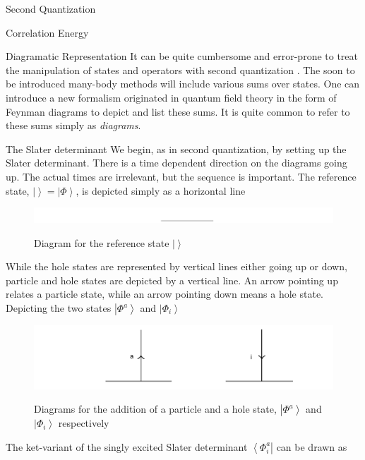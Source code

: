 \documentclass[twoside,english]{uiofysmaster}
\begin{document}
\begin{chapter}{Second Quantization}
\begin{section}{Correlation Energy}
	\end{section}
 
\end{chapter}



\begin{chapter}{Diagramatic Representation}
	It can be quite cumbersome and error-prone to treat the manipulation of states and operators with second quantization \cite{ShavittAndBartlett}. The soon to be introduced many-body methods will include various sums over states. One can introduce a new formalism originated in quantum field theory in the form of Feynman diagrams to depict and list these sums. It is quite common to refer to these sums simply as \textit{diagrams}. 

	\begin{section}{The Slater determinant}
		We begin, as in second quantization, by setting up the Slater determinant. There is a time dependent direction on the diagrams going up. The actual times are irrelevant, but the sequence is important. The reference state, $| \left. \right> = \left| \Phi \right>$, is depicted simply as a horizontal line
		\begin{figure}[H]
			\includegraphics[width=\textwidth]{Figures/SlaterDeterminant1.pdf}
			\label{Slaterdeterminant1}
			\caption{Diagram for the reference state $| \left. \right>$}
		\end{figure}
		While the hole states are represented by vertical lines either going up or down, particle and hole states are depicted by a vertical line. An arrow pointing up relates a particle state, while an arrow pointing down means a hole state. Depicting the two states $\left| \Phi^a \right> $ and $\left| \Phi_i \right>$
		\begin{figure}[H]
			\includegraphics[width=\textwidth]{Figures/SlaterDeterminant2.pdf}
			\label{Slaterdeterminant2}
			\caption{Diagrams for the addition of a particle and a hole state, $\left| \Phi^a \right> $ and $\left| \Phi_i \right> $ respectively}
		\end{figure}
		The ket-variant of the singly excited Slater determinant $\left< \Phi_i^a \right| $ can be drawn as

\end{section}
\end{chapter}
\end{document}
